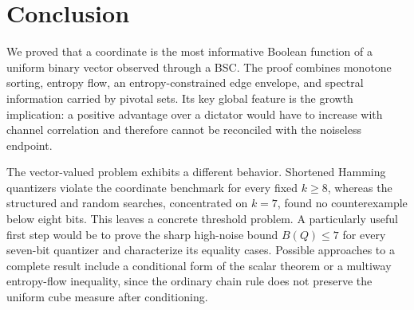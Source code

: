\section{Conclusion}
\label{sec:conclusion}

We proved that a coordinate is the most informative Boolean function of
a uniform binary vector observed through a BSC. The proof combines
monotone sorting, entropy flow, an entropy-constrained edge envelope, and
spectral information carried by pivotal sets. Its key global feature is
the growth implication: a positive advantage over a dictator would have
to increase with channel correlation and therefore cannot be reconciled
with the noiseless endpoint.

The vector-valued problem exhibits a different behavior. Shortened
Hamming quantizers violate the coordinate benchmark for every fixed
\(k\geq8\), whereas the structured and random searches, concentrated on
\(k=7\), found no counterexample below eight bits. This leaves a concrete
threshold problem. A
particularly useful first step would be to prove the sharp high-noise
bound \(B(Q)\leq7\) for every seven-bit quantizer and characterize its
equality cases. Possible approaches to a complete result include a
conditional form of the scalar theorem or a multiway entropy-flow
inequality, since the ordinary chain rule does not preserve
the uniform cube measure after conditioning.
